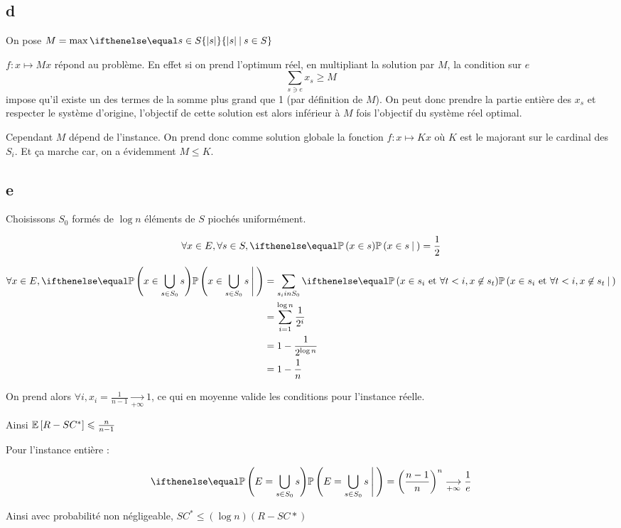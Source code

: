 \subsection*{d}
 
On pose $M=\max\set{|s|}{s\in S}$

$f : x\mapsto Mx$ répond au problème. En effet si on prend l'optimum réel, en multipliant la solution par $M$, la condition sur $e$
\[
    \sum\limits_{s \ni e} x_s \geqslant M
\]
impose qu'il existe un des termes de la somme plus grand que 1 (par définition de $M$). On peut donc prendre la partie entière des $x_s$ et respecter le système d'origine, l'objectif de cette solution est alors inférieur à $M$ fois l'objectif du système réel optimal.

Cependant $M$ dépend de l'instance. On prend donc comme solution globale la fonction $f:x\mapsto Kx$ où $K$ est le majorant sur le cardinal des $S_i$. Et ça marche car, on a évidemment $M\leqslant K$.

\subsection*{e}


Choisissons $S_0$ formés de $\log n$ éléments de $S$ piochés uniformément.

\[
    \forall x \in E, \forall s \in S, \proba{x \in s}{}=\frac{1}{2}
\]

\[
    \begin{aligned}
        \forall x \in E, \proba{x \in \bigcup\limits_{s\in S_0} s}{} &= \sum_{s_i in S_0}\proba{x \in s_i \text{ et } \forall t<i, x \not\in s_t }{}\\
        &= \sum_{i=1}^{\log n}{\frac{1}{2^i}}\\
        &= 1-\frac{1}{2^{\log n}}\\
        &= 1-\frac{1}{n}\\
    \end{aligned}
\]

On prend alors $\forall i, x_i=\frac{1}{n-1}\underset{+\infty}{\longrightarrow} 1$, ce qui en moyenne valide les conditions pour l'instance réelle.

Ainsi $\mathbb{E}\left[ R-SC^* \right]\leqslant \frac{n}{n-1}$

Pour l'instance entière :

\[
    \proba{E=\bigcup\limits_{s\in S_0} s}{}={\left(\frac{n-1}{n}\right)}^n \underset{+\infty}{\longrightarrow} \frac{1}{e}
\]

Ainsi avec probabilité non négligeable, $SC^* \leqslant (\log n) (R-SC*)$


